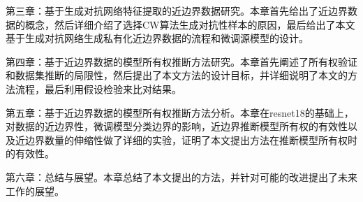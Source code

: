 第三章：基于生成对抗网络特征提取的近边界数据研究。本章首先给出了近边界数据的概念，然后详细介绍了选择CW算法生成对抗性样本的原因，最后给出了本文基于生成对抗网络生成私有化近边界数据的流程和微调源模型的设计。

第四章：基于近边界数据的模型所有权推断方法研究。本章首先阐述了所有权验证和数据集推断的局限性，然后提出了本文方法的设计目标，并详细说明了本文的方法流程，最后利用假设检验来比对结果。

第五章：基于近边界数据的模型所有权推断方法分析。本章在resnet18的基础上，对数据的近边界性，微调模型分类边界的影响，近边界推断模型所有权的有效性以及近边界数量的伸缩性做了详细的实验，证明了本文提出方法在推断模型所有权时的有效性。

第六章：总结与展望。本章总结了本文提出的方法，并针对可能的改进提出了未来工作的展望。
